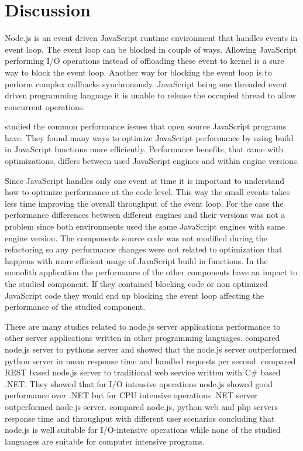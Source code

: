 \chapter{Discussion\label{discussion}}
Node.js is an event driven JavaScript runtime environment that handles events in event loop.
The event loop can be blocked in couple of ways.
Allowing JavaScript performing I/O operations instead of offloading these event to kernel is a sure way to block the event loop.
Another way for blocking the event loop is to perform complex callbacks synchronously.
JavaScript being one threaded event driven programming language it is unable to release the occupied thread to allow concurrent operations.

\cite{SelakovicPerformanceIssues} studied the common performance issues that open source JavaScript programs have.
They found many ways to optimize JavaScript performance by using build in JavaScript functions more efficiently.
Performance benefits, that came with optimizations, differs between used JavaScript engines and within engine versions.

Since JavaScript handles only one event at time it is important to understand how to optimize performance at the code level.
This way the small events takes less time improving the overall throughput of the event loop.
For the case the performance differences between different engines and their versions was not a problem since both environments used the same JavaScript engines with same engine version.
The components source code was not modified during the refactoring so any performance changes were not related to optimization that happens with more efficient usage of JavaScript build in functions.
In the monolith application the performance of the other components have an impact to the studied component.
If they contained blocking code or non optimized JavaScript code they would end up blocking the event loop affecting the performance of the studied component.

There are many studies related to node.js server applications performance to other server applications written in other programming languages.
\cite{Challapalli} compared node.js server to pythons server and showed that the node.js server outperformed python server in mean response time and handled requests per second.
\cite{Chitra} compared REST based node.js server to traditional web service written with C\# based .NET.
They showed that for I/O intensive operations node.js showed good performance over .NET but
for CPU intensive operations .NET server outperformed node.js server.
\cite{Lei} compared node.js, python-web and php servers response time and throughput with different user scenarios concluding that node.js is well suitable for I/O-intensive operations while none of the studied languages are suitable for computer intensive programs.

